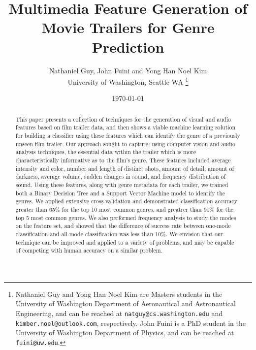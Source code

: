 \documentclass[letterpaper, 10 pt, conference]{ieeeconf}  %
\title{\LARGE \bf
Multimedia Feature Generation of Movie Trailers for Genre Prediction\\
}
\author{Nathaniel Guy, John Fuini and Yong Han Noel Kim\\
	University of Washington, Seattle WA%
\thanks{Nathaniel Guy and Yong Han Noel Kim are Masters students in the University of Washington Department of Aeronautical and Astronautical Engineering, and can be reached at {\tt\small natguy@cs.washington.edu} and {\tt\small kimber.noel@outlook.com}, respectively. John Fuini is a PhD student in the University of Washington Department of Physics, and can be reached at {\tt\small fuini@uw.edu}. }%
}
\date{ \today}
\begin{document}
\maketitle
\thispagestyle{empty}
\pagestyle{empty}

\begin{abstract}
This paper presents a collection of techniques for the generation of visual and audio features based on film trailer data, and then shows a viable machine learning solution for building a classifier using these features which can identify the genre of a previously unseen film trailer. Our approach sought to capture, using computer vision and audio analysis techniques, the essential data within the trailer which is more characteristically informative as to the film's genre. These features included average intensity and color, number and length of distinct shots, amount of detail, amount of darkness, average volume, sudden changes in sound, and frequency distribution of sound. Using these features, along with genre metadata for each trailer, we trained both a Binary Decision Tree and a Support Vector Machine model to identify the genres. We applied extensive cross-validation and demonstrated classification accuracy greater than 65\% for the top 10 most common genres, and greatrer than 90\% for the top 5 most common genres. We also performed frequency analysis to study the modes on the feature set, and showed that the difference of success rate between one-mode classification and all-mode classification was less than 10\%. We envision that our technique can be improved and applied to a variety of problems, and may be capable of competing with human accuracy on a similar problem.
\end{abstract}

\end{document}
